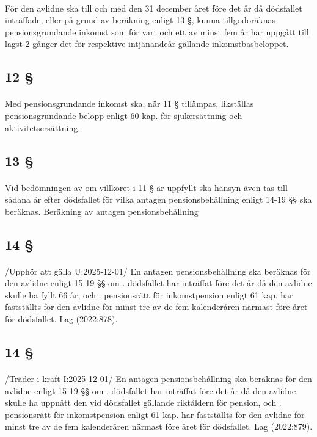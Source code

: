 \documentclass[a4paper,notitlepage,openany,10pt]{book}
\begin{document}
\paragraph*{}
För den avlidne ska till och med den 31 december året före det år då dödsfallet inträffade, eller på grund av beräkning enligt 13 §, kunna tillgodoräknas pensionsgrundande inkomst som för vart och ett av minst fem år har uppgått till lägst 2 gånger det för respektive intjänandeår gällande inkomstbasbeloppet.
\subsection*{12 §}
\paragraph*{}
Med pensionsgrundande inkomst ska, när 11 § tillämpas, likställas pensionsgrundande belopp enligt 60 kap. för sjukersättning och aktivitetsersättning.
\subsection*{13 §}
\paragraph*{}
Vid bedömningen av om villkoret i 11 § är uppfyllt ska hänsyn även tas till sådana år efter dödsfallet för vilka antagen pensionsbehållning enligt 14-19 §§ ska beräknas.
Beräkning av antagen pensionsbehållning
\subsection*{14 §}
\paragraph*{}
/Upphör att gälla U:2025-12-01/
En antagen pensionsbehållning ska beräknas för den avlidne enligt 15-19 §§ om
. dödsfallet har inträffat före det år då den avlidne skulle ha fyllt 66 år, och
. pensionsrätt för inkomstpension enligt 61 kap. har fastställts för den avlidne för minst tre av de fem kalenderåren närmast före året för dödsfallet.
Lag (2022:878).
\subsection*{14 §}
\paragraph*{}
/Träder i kraft I:2025-12-01/
En antagen pensionsbehållning ska beräknas för den avlidne enligt 15-19 §§ om
. dödsfallet har inträffat före det år då den avlidne skulle ha uppnått den vid dödsfallet gällande riktåldern för pension, och
. pensionsrätt för inkomstpension enligt 61 kap. har fastställts för den avlidne för minst tre av de fem kalenderåren närmast före året för dödsfallet.
Lag (2022:879).
\end{document}
